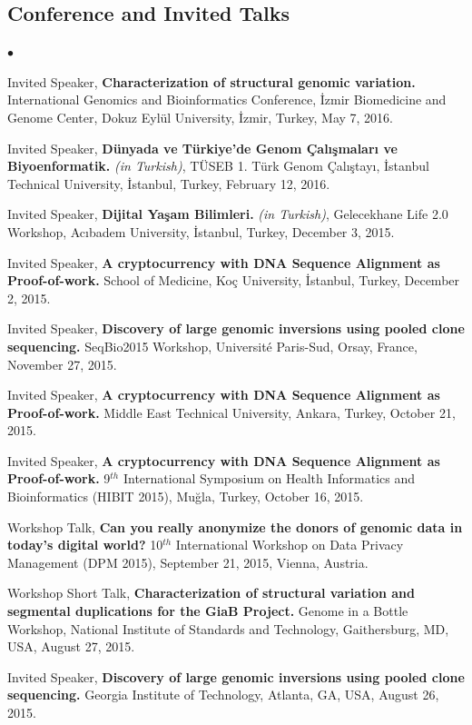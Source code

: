 \documentclass[margin,line]{res}
\newenvironment{list2}{
  \begin{list}{$\bullet$}{%
      \setlength{\itemsep}{0in}
      \setlength{\parsep}{0in} \setlength{\parskip}{0in}
      \setlength{\topsep}{0in} \setlength{\partopsep}{0in} 
      \setlength{\leftmargin}{0.2in}}}{\end{list}}
\begin{document}
\begin{resume}
\vspace*{-.2cm}
\section{\sc Conference and Invited Talks}

\begin{list2}
\item
  Invited Speaker, 
  {\bf Characterization of structural genomic variation.}
  International Genomics and Bioinformatics Conference,
  İzmir Biomedicine and Genome Center, Dokuz Eylül University, İzmir, Turkey, May 7, 2016.
\item
  Invited Speaker,
  {\bf Dünyada ve Türkiye'de Genom Çalışmaları ve Biyoenformatik.} {\it (in Turkish)},
  TÜSEB 1. Türk Genom Çalıştayı, İstanbul Technical University, İstanbul, Turkey, February 12, 2016.
\item
  Invited Speaker,
  {\bf Dijital Yaşam Bilimleri.} {\it (in Turkish)},
  Gelecekhane Life 2.0 Workshop, Acıbadem University, \.{I}stanbul, Turkey, December 3, 2015.
\item
  Invited Speaker,
  {\bf A cryptocurrency with DNA Sequence Alignment as Proof-of-work.}
  School of Medicine, Ko\c{c} University, \.{I}stanbul, Turkey, December 2, 2015.
\item
  Invited Speaker, 
  {\bf Discovery of large genomic inversions using pooled clone sequencing.}
  SeqBio2015 Workshop, Université Paris-Sud, Orsay, France, November 27, 2015.
\item
  Invited Speaker,
  {\bf A cryptocurrency with DNA Sequence Alignment as Proof-of-work.}
  Middle East Technical University, Ankara, Turkey, October 21, 2015.
\item
  Invited Speaker,
  {\bf A cryptocurrency with DNA Sequence Alignment as Proof-of-work.}
  9$^{th}$ International Symposium on Health Informatics and Bioinformatics (HIBIT 2015),
   Muğla, Turkey, October 16, 2015.
\item
  Workshop Talk, 
  {\bf Can you really anonymize the donors of genomic data in today's digital world?}
  10$^{th}$ International Workshop on Data Privacy Management (DPM 2015), 
  September 21, 2015, Vienna, Austria.
\item
  Workshop Short Talk, 
  {\bf Characterization of structural variation and segmental duplications for the GiaB Project.}
  Genome in a Bottle Workshop, National Institute of Standards and Technology, Gaithersburg, MD, USA,
  August 27, 2015.
\item
  Invited Speaker, 
  {\bf Discovery of large genomic inversions using pooled clone sequencing.}
  Georgia Institute of Technology, Atlanta, GA, USA, August 26, 2015.


\end{list2}
\end{resume}
\end{document}
